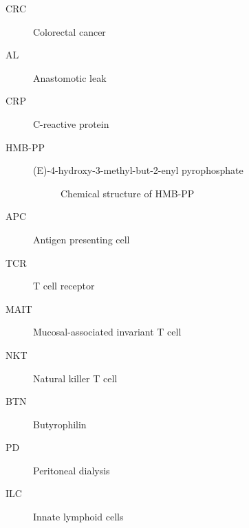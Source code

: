\begin{description}
    \item[CRC] Colorectal cancer
    \item[AL] Anastomotic leak
    \item[CRP] C-reactive protein
    \item[HMB-PP] (E)-4-hydroxy-3-methyl-but-2-enyl pyrophosphate
    \newline
    \begin{figure}[h]
        \begin{center}
        \end{center}
      \caption{Chemical structure of HMB-PP}
      \label{hmbpp_structure}
    \end{figure}
    \item[APC] Antigen presenting cell
    \item[TCR] T cell receptor
    \item[MAIT] Mucosal-associated invariant T cell
    \item[NKT] Natural killer T cell
    \item[BTN] Butyrophilin
    \item[PD] Peritoneal dialysis
    \item[ILC] Innate lymphoid cells
\end{description}

 
